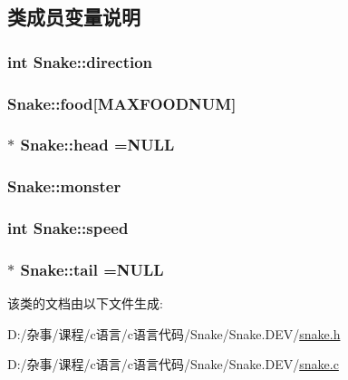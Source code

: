 \subsection{类成员变量说明}
\hypertarget{class_snake_a1349ccf7f145382b601ac41927f84af4}{}
\subsubsection[{direction}]{\setlength{\rightskip}{0pt plus 5cm}int Snake\+::direction}\label{class_snake_a1349ccf7f145382b601ac41927f84af4}
\hypertarget{class_snake_a2abf1fa22e67f5d911d973a5dea52f4d}{}
\subsubsection[{food}]{ Snake\+::food\mbox{[}{\bf M\+A\+X\+F\+O\+O\+D\+N\+U\+M}\mbox{]}}\label{class_snake_a2abf1fa22e67f5d911d973a5dea52f4d}
\hypertarget{class_snake_a99959d37db34343d4d0c4a618e72fd43}{}
\subsubsection[{head}]{$\ast$ Snake\+::head =N\+U\+L\+L}\label{class_snake_a99959d37db34343d4d0c4a618e72fd43}
\hypertarget{class_snake_a28ed7a3049eb61c81bc3aef5487b6e3e}{}
\subsubsection[{monster}]{ Snake\+::monster}\label{class_snake_a28ed7a3049eb61c81bc3aef5487b6e3e}
\hypertarget{class_snake_a18db40ca997cae2a8be85987330010f1}{}
\subsubsection[{speed}]{\setlength{\rightskip}{0pt plus 5cm}int Snake\+::speed}\label{class_snake_a18db40ca997cae2a8be85987330010f1}
\hypertarget{class_snake_a7d6269120c57743dd7da9da7bf2c1bc4}{}
\subsubsection[{tail}]{$\ast$ Snake\+::tail =N\+U\+L\+L}\label{class_snake_a7d6269120c57743dd7da9da7bf2c1bc4}


该类的文档由以下文件生成\+:\begin{DoxyCompactItemize}
\item 
D\+:/杂事/课程/c语言/c语言代码/\+Snake/\+Snake.\+D\+E\+V/\hyperlink{snake_8h}{snake.\+h}\item 
D\+:/杂事/课程/c语言/c语言代码/\+Snake/\+Snake.\+D\+E\+V/\hyperlink{snake_8c}{snake.\+c}\end{DoxyCompactItemize}
